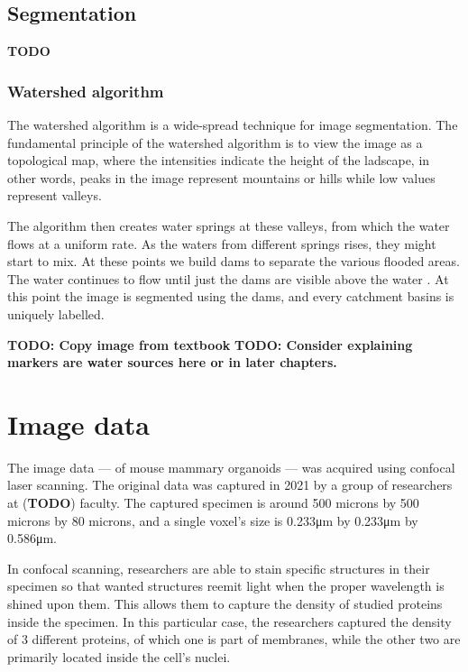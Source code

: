 \documentclass[
  digital,     %
  oneside,     %
  nosansbold,  %
  nocolorbold, %
  lof,         %
  lot,         %
]{fithesis4}
\begin{document}
\section{Segmentation}

\textbf{TODO}

\subsection{Watershed algorithm}

The watershed algorithm is a wide-spread technique for image segmentation. The
fundamental principle of the watershed algorithm is to view the image as a
topological map, where the intensities indicate the height of the ladscape, in
other words, peaks in the image represent mountains or hills while low values
represent valleys.

The algorithm then creates water springs at these valleys, from which the water
flows at a uniform rate. As the waters from different springs rises, they might
start to mix. At these points we build dams to separate the various flooded
areas. The water continues to flow until just the dams are visible above the
water \cite{gonzalez2002}. At this point the image is segmented using the dams,
and every catchment basins is uniquely labelled.

\textbf{TODO: Copy image from textbook}
\textbf{TODO: Consider explaining markers are water sources here or in later
chapters.}

\chapter{Image data}

The image data --- of mouse mammary organoids --- was acquired using confocal
laser scanning. The original data was captured in 2021 by a group of
researchers at (\textbf{TODO}) faculty. The captured specimen is around 500
microns by 500 microns by 80 microns, and a single voxel's size is 0.233μm by
0.233μm by 0.586μm.

In confocal scanning, researchers are able to stain specific structures in
their specimen so that wanted structures reemit light when the proper wavelength
is shined upon them. This allows them to capture the density of studied proteins
inside the specimen. In this particular case, the researchers captured the
density of 3 different proteins, of which one is part of membranes, while the
other two are primarily located inside the cell's nuclei.
\end{document}
